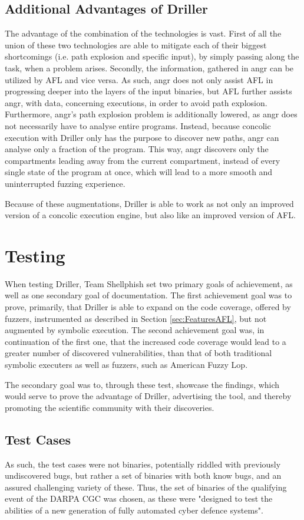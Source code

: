 \documentclass[a4paper]{article}
\begin{document}
\subsection{Additional Advantages of Driller}
\label{sec:DrillerAdditionalAdvantages}
The advantage of the combination of the technologies is vast. First of all the union of these two technologies are able to mitigate each of their biggest shortcomings (i.e. path explosion and specific input), by simply passing along the task, when a problem arises. Secondly, the information, gathered in angr can be utilized by AFL and vice versa. As such, angr does not only assist AFL in progressing deeper into the layers of the input binaries, but AFL further assists angr, with data, concerning executions, in order to avoid path explosion. Furthermore, angr's path explosion problem is additionally lowered, as angr does not necessarily have to analyse entire programs. Instead, because concolic execution with Driller only has the purpose to discover new paths, angr can analyse only a fraction of the program. This way, angr discovers only the compartments leading away from the current compartment, instead of every single state of the program at once, which will lead to a more smooth and uninterrupted fuzzing experience.

Because of these augmentations, Driller is able to work as not only an improved version of a concolic execution engine, but also like an improved version of AFL.
\section{Testing}
\label{sec:Testing}
When testing Driller, Team Shellphish set two primary goals of achievement, as well as one secondary goal of documentation. The first achievement goal was to prove, primarily, that Driller is able to expand on the code coverage, offered by fuzzers, instrumented as described in Section \ref{sec:FeaturesAFL}, but not augmented by symbolic execution. The second achievement goal was, in continuation of the first one, that the increased code coverage would lead to a greater number of discovered vulnerabilities, than that of both traditional symbolic executers as well as fuzzers, such as American Fuzzy Lop.

The secondary goal was to, through these test, showcase the findings, which would serve to prove the advantage of Driller, advertising the tool, and thereby promoting the scientific community with their discoveries.
\subsection{Test Cases}
\label{sec:TestCases}
As such, the test cases were not binaries, potentially riddled with previously undiscovered bugs, but rather a set of binaries with both know bugs, and an assured challenging variety of these. Thus, the set of binaries of the qualifying event of the DARPA CGC was chosen, as these were "designed to test the abilities of a new generation of fully automated cyber defence systems"\cite{DARPA}.
\end{document}
